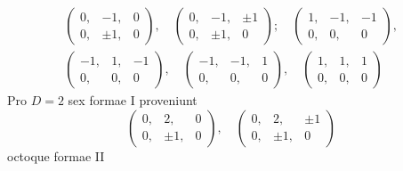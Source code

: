 \[
\begin{gathered}
\left(\begin{smallmatrix}0,&-1,&0\\0,&\pm1,&0\end{smallmatrix}\right),\quad
\left(\begin{smallmatrix}0,&-1,&\pm1\\0,&\pm1,&0\end{smallmatrix}\right);\quad
\left(\begin{smallmatrix}1,&-1,&-1\\0,&0,&0\end{smallmatrix}\right),\\
\left(\begin{smallmatrix}-1,&1,&-1\\0,&0,&0\end{smallmatrix}\right),\quad
\left(\begin{smallmatrix}-1,&-1,&1\\0,&0,&0\end{smallmatrix}\right),\quad
\left(\begin{smallmatrix}1,&1,&1\\0,&0,&0\end{smallmatrix}\right)
\end{gathered}
\]
Pro \(D=2\) sex formae I proveniunt
\[
\left(\begin{smallmatrix}0,&2,&0\\0,&\pm1,&0\end{smallmatrix}\right),\quad
\left(\begin{smallmatrix}0,&2,&\pm1\\0,&\pm1,&0\end{smallmatrix}\right)
\]
octoque formae II
